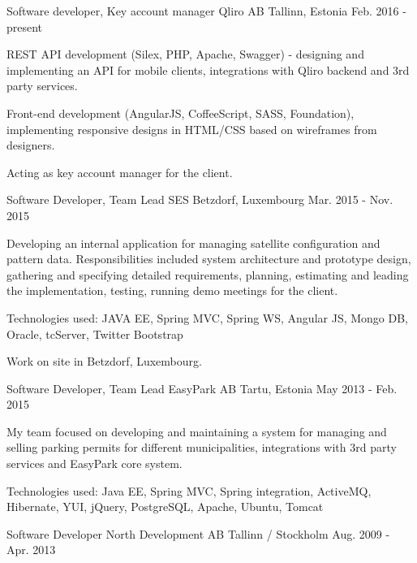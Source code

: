 \begin{cventries}
  \cventry
    {Software developer, Key account manager}
    {Qliro AB}
    {Tallinn, Estonia}
    {Feb. 2016 - present}
    {
      \begin{cvitems}
        \item { REST API development (Silex, PHP, Apache, Swagger) - designing and implementing an API for mobile clients, integrations with Qliro backend and 3rd party services.}
        \item { Front-end development (AngularJS, CoffeeScript, SASS, Foundation), implementing responsive designs in HTML/CSS based on wireframes from designers.}
        \item { Acting as key account manager for the client.}  
      \end{cvitems}
    }
  \cventry
    {Software Developer, Team Lead}
    {SES}
    {Betzdorf, Luxembourg}
    {Mar. 2015 - Nov. 2015}
    {
      \begin{cvitems}
        \item {Developing an internal application for managing satellite configuration and pattern data. Responsibilities included system architecture and prototype design, gathering and specifying detailed requirements, planning, estimating and leading the implementation, testing, running demo meetings for the client.}
        \item { Technologies used: JAVA EE, Spring MVC, Spring WS, Angular JS, Mongo DB, Oracle, tcServer, Twitter Bootstrap }  
        \item { Work on site in Betzdorf, Luxembourg. }  
      \end{cvitems}
    }
  \cventry
    {Software Developer, Team Lead}
    {EasyPark AB}
    {Tartu, Estonia}
    {May 2013 - Feb. 2015}
    {
      \begin{cvitems}
        \item {My team focused on developing and maintaining a system for managing and selling parking permits for different municipalities, integrations with 3rd party services and EasyPark core system.}
        \item {Technologies used: Java EE, Spring MVC, Spring integration, ActiveMQ, Hibernate, YUI, jQuery, PostgreSQL, Apache, Ubuntu, Tomcat }  
      \end{cvitems}
    }
  \cventry
    {Software Developer}
    {North Development AB}
    {Tallinn / Stockholm}
    {Aug. 2009 - Apr. 2013}
    {
      \begin{cvitems}

\end{cvitems}}
\end{cventries}
